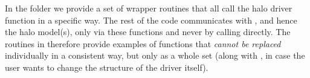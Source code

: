 
In the folder  we provide a set of wrapper
routines that all call the halo driver function  in 
a specific way. The rest of the code communicates with ,
and hence the halo model(s), only via these functions and never by 
calling  directly. The routines in   
therefore provide examples of functions that {\it cannot be
replaced} individually in a consistent way, but only as a whole set 
(along with ,
in case the user wants to change the structure of the driver itself).  
